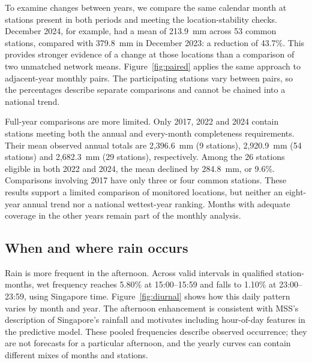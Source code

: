\begingroup{}
To examine changes between years, we compare the same calendar month at stations present in both periods and meeting the location-stability checks. December 2024, for example, had a mean of 213.9~mm across 53 common stations, compared with 379.8~mm in December 2023: a reduction of 43.7\%. This provides stronger evidence of a change at those locations than a comparison of two unmatched network means. Figure~\ref{fig:paired} applies the same approach to adjacent-year monthly pairs. The participating stations vary between pairs, so the percentages describe separate comparisons and cannot be chained into a national trend.\par\endgroup


Full-year comparisons are more limited. Only 2017, 2022 and 2024 contain stations meeting both the annual and every-month completeness requirements. Their mean observed annual totals are 2,396.6~mm (9 stations), 2,920.9~mm (54 stations) and 2,682.3~mm (29 stations), respectively. Among the 26 stations eligible in both 2022 and 2024, the mean declined by 284.8~mm, or 9.6\%. Comparisons involving 2017 have only three or four common stations. These results support a limited comparison of monitored locations, but neither an eight-year annual trend nor a national wettest-year ranking. Months with adequate coverage in the other years remain part of the monthly analysis.

\subsection{When and where rain occurs}

Rain is more frequent in the afternoon. Across valid intervals in qualified station-months, wet frequency reaches 5.80\% at 15:00--15:59 and falls to 1.10\% at 23:00--23:59, using Singapore time. Figure~\ref{fig:diurnal} shows how this daily pattern varies by month and year. The afternoon enhancement is consistent with MSS's description of Singapore's rainfall \cite{climate} and motivates including hour-of-day features in the predictive model. These pooled frequencies describe observed occurrence; they are not forecasts for a particular afternoon, and the yearly curves can contain different mixes of months and stations.

